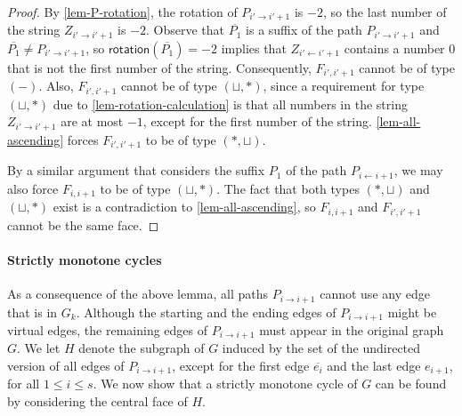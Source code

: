 \documentclass{theoretics}
\newcommand{\rotation}{\mathsf{rotation}}
\begin{document}
\begin{proof}
By \cref{lem-P-rotation}, the rotation of $P_{i' \rightarrow i'+1}$ is $-2$, so the last number of the string $Z_{i' \rightarrow i'+1}$ is $-2$.
Observe that $\overline{P_1}$ is a suffix of the path $P_{i' \rightarrow i'+1}$ and $\overline{P_1} \neq P_{i' \rightarrow i'+1}$, so $\rotation(\overline{P_1}) = -2$ implies that  
$Z_{i' \leftarrow i'+1}$ contains a number $0$ that is not the first number of the string. Consequently,  $F_{i',i'+1}$ cannot be of type $(-)$.
Also, $F_{i',i'+1}$  cannot be of type $(\sqcup,\ast)$, since a requirement for type $(\sqcup,\ast)$ due to \cref{lem-rotation-calculation} is that all numbers in the string  $Z_{i' \rightarrow i'+1}$ are at most $-1$, except for the first number of the string. \cref{lem-all-ascending} forces $F_{i',i'+1}$ to be of  type $(\ast,\sqcup)$. 

By a similar argument that considers the suffix $P_1$  of the path $P_{i \leftarrow i+1}$, we may also force $F_{i,i+1}$ to be of type $(\sqcup,\ast)$. The fact that both types $(\ast,\sqcup)$ and $(\sqcup,\ast)$ exist is a contradiction to \cref{lem-all-ascending}, so $F_{i,i+1}$ and $F_{i',i'+1}$ cannot be the same face.
\end{proof}

\paragraph{Strictly monotone cycles}
As a consequence of the above lemma, all paths $P_{i \rightarrow i+1}$ cannot use any edge that is in $G_{k}$. Although the starting and the ending edges of $P_{i \rightarrow i+1}$ might be virtual edges, the remaining edges of $P_{i \rightarrow i+1}$ must appear in the original graph $G$. We let $H$ denote the subgraph of $G$ induced by the set of the undirected version of all edges of $P_{i \rightarrow i+1}$, except for the first edge $\overline{e_i}$ and the last edge $e_{i+1}$, for all $1 \leq i \leq s$.  We now show that a strictly monotone cycle of $G$ can be found by considering the central face of $H$.
\end{document}
